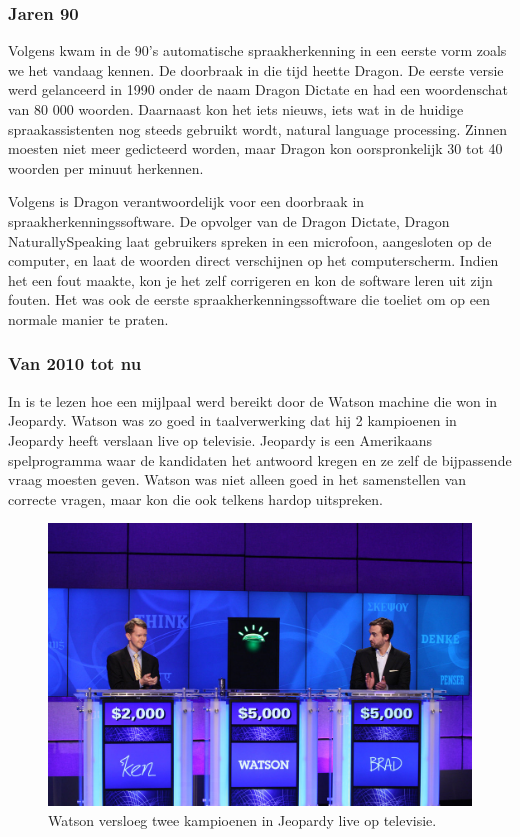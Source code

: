 \subsubsection{Jaren 90}
Volgens \textcite{Kincaid2018} kwam in de 90's automatische spraakherkenning in een eerste vorm zoals we het vandaag kennen. De doorbraak in die tijd heette Dragon. De eerste versie werd gelanceerd in 1990 onder de naam Dragon Dictate en had een woordenschat van 80 000 woorden. Daarnaast kon het iets nieuws, iets wat in de huidige spraakassistenten nog steeds gebruikt wordt, natural language processing. Zinnen moesten niet meer gedicteerd worden, maar Dragon kon oorspronkelijk 30 tot 40 woorden per minuut herkennen.

Volgens \textcite{Puri1998} is Dragon verantwoordelijk voor een doorbraak in spraakherkenningssoftware. De opvolger van de Dragon Dictate, Dragon NaturallySpeaking laat gebruikers spreken in een microfoon, aangesloten op de computer, en laat de woorden direct verschijnen op het computerscherm. Indien het een fout maakte, kon je het zelf corrigeren en kon de software leren uit zijn fouten. Het was ook de eerste spraakherkenningssoftware die toeliet om op een normale manier te praten.

\subsubsection{Van 2010 tot nu}
In \textcite{IBM2011} is te lezen hoe een mijlpaal werd bereikt door de Watson machine die won in Jeopardy. Watson was zo goed in taalverwerking dat hij 2 kampioenen in Jeopardy heeft verslaan live op televisie. Jeopardy is een Amerikaans spelprogramma waar de kandidaten het antwoord kregen en ze zelf de bijpassende vraag moesten geven. Watson was niet alleen goed in het samenstellen van correcte vragen, maar kon die ook telkens hardop uitspreken.

\begin{figure}[h]
    \centering
    \includegraphics[width=0.7\linewidth]{img/WatsonJeopardy}
    \caption{Watson versloeg twee kampioenen in Jeopardy live op televisie. \autocite{Markoff2011}}
    \label{fig:watson}
\end{figure}

